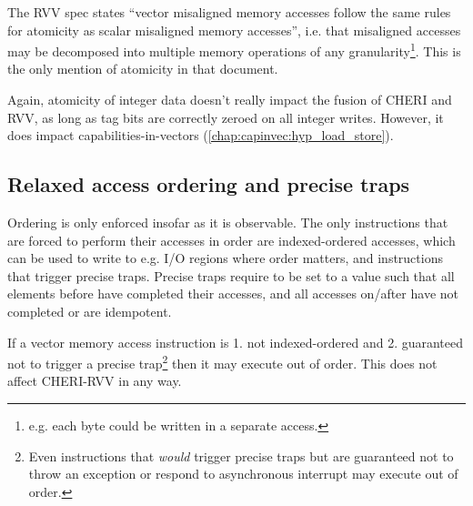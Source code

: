 The RVV spec states \enquote{vector misaligned memory accesses follow the same rules for atomicity as scalar misaligned memory accesses}, i.e. that misaligned accesses may be decomposed into multiple memory operations of any granularity\footnote{e.g. each byte could be written in a separate access.}.
This is the only mention of atomicity in that document.

Again, atomicity of integer data doesn't really impact the fusion of CHERI and RVV, as long as tag bits are correctly zeroed on all integer writes.
However, it does impact capabilities-in-vectors (\cref{chap:capinvec:hyp_load_store}).

\subsection{Relaxed access ordering and precise traps}
Ordering is only enforced insofar as it is observable.
The only instructions that are forced to perform their accesses in order are indexed-ordered accesses, which can be used to write to e.g. I/O regions where order matters, and instructions that trigger precise traps.
Precise traps require  to be set to a value such that all elements before  have completed their accesses, and all accesses on/after  have not completed or are idempotent.

If a vector memory access instruction is 1. not indexed-ordered and 2. guaranteed not to trigger a precise trap\footnote{Even instructions that \emph{would} trigger precise traps but are guaranteed not to throw an exception or respond to asynchronous interrupt may execute out of order.} then it may execute out of order.
This does not affect CHERI-RVV in any way.